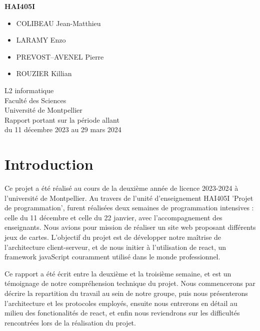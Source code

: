 \documentclass[a4paper]{article}
\begin{document}
\centerline{\Huge\bf HAI405I}
\vspace*{1.5cm}
\begin{center}               %
	
\end{center}
\vspace*{1.5cm}


\vspace*{1.5cm}


\begin{itemize}
\item COLIBEAU Jean-Matthieu
\item LARAMY Enzo
\item PREVOST--AVENEL Pierre
\item ROUZIER Killian
\end{itemize}
\vspace*{1.5cm}
\begin{center}
  L2 informatique\\
  Faculté des Sciences\\
    Université de Montpellier\\
    \vspace{12pt}
    Rapport portant sur la période allant\\
    du 11 décembre 2023 au 29 mars 2024
\end{center}

\newpage

\section{Introduction}
Ce projet a été réalisé au cours de la deuxième année de licence 2023-2024 à l'université de Montpellier. Au travers de l'unité d'enseignement HAI405I 'Projet de programmation', furent réalisées deux semaines de programmation intensives : celle du  11  décembre et celle du 22 janvier, avec l'accompagnement des enseignants. Nous avions pour mission de réaliser un site web proposant différents jeux de cartes. L'objectif du projet est de développer notre maîtrise de l'architecture client-serveur, et de nous initier à l'utilisation de react, un framework javaScript couramment utilisé dans le monde professionnel.

Ce rapport a été écrit entre la deuxième et la troisième semaine, et est un témoignage de notre compréhension technique du projet. Nous commencerons par décrire la repartition du travail au sein de notre groupe, puis nous présenterons l'architecture et les protocoles employés, ensuite nous entrerons en détail au milieu des fonctionalités de react, et enfin nous reviendrons sur les difficultés rencontrées lors de la réalisation du projet. 
\end{document}
